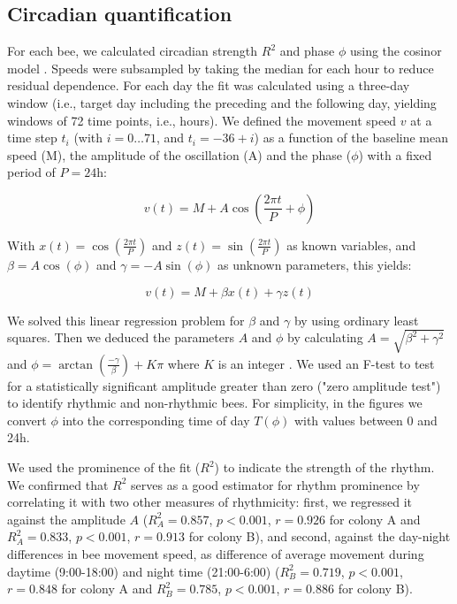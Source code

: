\documentclass{article}
\begin{document}
\subsection*{Circadian quantification}
For each bee, we calculated circadian strength $R^2$ and phase $\phi$ using the cosinor model \cite{halberg_chronobiology_1969, nelson_methods_1979, bingham_inferential_1982}. Speeds were subsampled by taking the median for each hour to reduce residual dependence. For each day the fit was calculated using a three-day window (i.e., target day including the preceding and the following day, yielding windows of 72 time points, i.e., hours). We defined the movement speed $v$ at a time step $t_i$ (with $i = 0 \ldots 71$, and $t_i = -36 + i$) as a function of the baseline mean speed (M), the amplitude of the oscillation (A) and the phase ($\phi$) with a fixed period of $P = 24$h:

\begin{equation}
v(t) = M + A \cos\left(\frac{2 \pi t}{P} + \phi\right)
\end{equation}

With $x(t) = \cos\left(\frac{2\pi t}{P}\right)$ and $z(t) = \sin\left(\frac{2\pi t}{P}\right)$ as known variables, and $\beta = A \cos(\phi)$ and $\gamma = -A \sin(\phi)$ as unknown parameters, this yields:

\begin{equation}
v(t) = M + \beta x(t) + \gamma z(t)
\end{equation}

We solved this linear regression problem for $\beta$ and $\gamma$ by using ordinary least squares. Then we deduced the parameters $A$ and $\phi$ by calculating $A = \sqrt{\beta^2 + \gamma^2}$ and $\phi = \arctan\left(\frac{-\gamma}{\beta}\right) + K\pi$ where $K$ is an integer \cite{cornelissen_cosinor-based_2014}. We used an F-test \cite{cornelissen_cosinor-based_2014} to test for a statistically significant amplitude greater than zero ("zero amplitude test") to identify rhythmic and non-rhythmic bees. For simplicity, in the figures we convert $\phi$ into the corresponding time of day $T(\phi)$ with values between 0 and 24h.

We used the prominence of the fit ($R^2$) to indicate the strength of the rhythm. We confirmed that $R^2$ serves as a good estimator for rhythm prominence by correlating it with two other measures of rhythmicity: first, we regressed it against the amplitude $A$ ($R_{A}^2 = 0.857$, $p < 0.001$, $r = 0.926$ for colony A and $R_{A}^2 = 0.833$, $p < 0.001$, $r = 0.913$ for colony B), and second, against the day-night differences in bee movement speed, as difference of average movement during daytime (9:00-18:00) and night time (21:00-6:00) ($R_{B}^2 = 0.719$, $p < 0.001$, $r = 0.848$ for colony A and $R_{B}^2 = 0.785$, $p < 0.001$, $r = 0.886$ for colony B).
\end{document}
